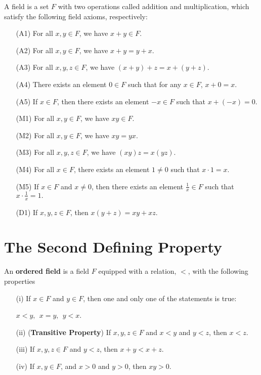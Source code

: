 \documentclass[a4paper]{article}
\begin{document}
\begin{definition}[Fields]\label{Field}
   A field is a set \( F  \) with two operations called addition and multiplication, which satisfy the following field axioms, respectively:
    \begin{enumerate}
        \item[(A1)] For all \( x,y \in F  \), we have \( x + y \in F  \). 
        \item[(A2)] For all \( x,y \in F  \), we have \( x + y = y + x  \).
        \item[(A3)] For all \( x,y,z \in F  \), we have \( (x+y) + z = x + (y + z) \). 
        \item[(A4)] There exists an element \( 0 \in F  \) such that for any \( x \in F  \), \(  x + 0 = x  \).
        \item[(A5)] If \( x \in F  \), then there exists an element \( -x \in F  \) such that \( x + (-x) = 0 \).
        \item[(M1)] For all \( x,y \in F  \), we have \( xy \in F  \). 
        \item[(M2)] For all \( x,y \in F  \), we have \( xy = yx  \). 
        \item[(M3)] For all \( x,y,z \in F  \), we have \( (xy)z = x(yz) \).
        \item[(M4)] For all \( x \in F  \), there exists an element \( 1 \neq 0  \) such that \( x \cdot 1 =x  \).
        \item[(M5)] If \( x \in F  \) and \( x \neq 0  \), then there exists an element \( \frac{  1  }{ x }  \in F  \) such that \(  x \cdot \frac{ 1 }{ x }  = 1.  \)
        \item[(D1)] If \( x,y,z \in F  \), then \( x(y+z) = xy + xz \).
    \end{enumerate}   
\end{definition}

\section{The Second Defining Property}

\begin{definition}\label{Ordered Fields}
    An \textbf{ordered field} is a field \( F  \) equipped with a relation, \( <  \), with the following properties 
    \begin{enumerate}
        \item[(i)] If \( x \in F  \) and \( y \in F  \), then one and only one of the statements is true:
            \begin{center}
                \( x <y , \ \ x = y, \ \  y < x  \).
            \end{center}
        \item[(ii)](\textbf{Transitive Property}) If \( x,y,z \in F  \) and \( x < y  \) and \( y < z  \), then \( x < z  \).
        \item[(iii)] If \( x,y, z \in F  \) and \(  y < z  \), then \( x + y < x + z  \).
        \item[(iv)] If \( x,y \in F  \), and \( x > 0  \) and \( y > 0  \), then \( xy > 0  \).
    \end{enumerate}
\end{definition}
\end{document}
